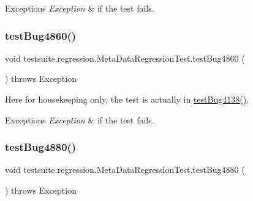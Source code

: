 \begin{DoxyExceptions}{Exceptions}
{\em Exception} & if the test fails. \\
\hline
\end{DoxyExceptions}
\mbox{\label{classtestsuite_1_1regression_1_1_meta_data_regression_test_a9c33a8fd6a670158feb2efa4cbf966ad}} 
\subsubsection{\texorpdfstring{test\+Bug4860()}{testBug4860()}}
{\footnotesize\ttfamily void testsuite.\+regression.\+Meta\+Data\+Regression\+Test.\+test\+Bug4860 (\begin{DoxyParamCaption}{ }\end{DoxyParamCaption}) throws Exception}

Here for housekeeping only, the test is actually in \mbox{\hyperlink{classtestsuite_1_1regression_1_1_meta_data_regression_test_a5c0ea954c7204a811055ea0487e75862}{test\+Bug4138()}}.


\begin{DoxyExceptions}{Exceptions}
{\em Exception} & if the test fails. \\
\hline
\end{DoxyExceptions}
\mbox{\label{classtestsuite_1_1regression_1_1_meta_data_regression_test_a5f79cbc323ee6b50a304811b962f4b37}} 
\subsubsection{\texorpdfstring{test\+Bug4880()}{testBug4880()}}
{\footnotesize\ttfamily void testsuite.\+regression.\+Meta\+Data\+Regression\+Test.\+test\+Bug4880 (\begin{DoxyParamCaption}{ }\end{DoxyParamCaption}) throws Exception}

